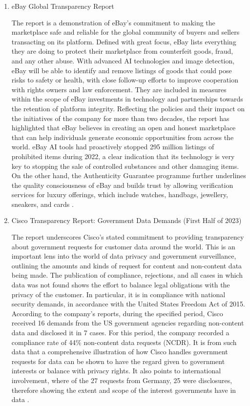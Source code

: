 \begin{enumerate}
\item eBay Global Transparency Report 

 The report is a demonstration of eBay's commitment to making the marketplace safe and reliable for the global community of buyers and sellers transacting on its platform. Defined with great focus, eBay lists everything they are doing to protect their marketplace from counterfeit goods, fraud, and any other abuse. With advanced AI technologies and image detection, eBay will be able to identify and remove listings of goods that could pose risks to safety or health, with close follow-up efforts to improve cooperation with rights owners and law enforcement. They are included in measures within the scope of eBay investments in technology and partnerships towards the retention of platform integrity. Reflecting the policies and their impact on the initiatives of the company for more than two decades, the report has highlighted that eBay believes in creating an open and honest marketplace that can help individuals generate economic opportunities from across the world. eBay AI tools had proactively stopped 295 million listings of prohibited items during 2022, a clear indication that its technology is very key to stopping the sale of controlled substances and other damaging items. On the other hand, the Authenticity Guarantee programme further underlines the quality consciousness of eBay and builds trust by allowing verification services for luxury offerings, which include watches, handbags, jewellery, sneakers, and cards \cite{eBayGlobalTransparencyReport2022}.

 \item Cisco Transparency Report: Government Data Demands (First Half of 2023)

 The report underscores Cisco's stated commitment to providing transparency about government requests for customer data around the world. This is an important lens into the world of data privacy and government surveillance, outlining the amounts and kinds of request for content and non-content data being made. The publication of compliance, rejections, and all cases in which data was not found shows the effort to balance legal obligations with the privacy of the customer. In particular, it is in compliance with national security demands, in accordance with the United States Freedom Act of 2015. According to the company's reports, during the specified period, Cisco received 16 demands from the US government agencies regarding non-content data and disclosed it in 7 cases. For this period, the company recorded a compliance rate of 44\% non-content data requests (NCDR). It is from such data that a comprehensive illustration of how Cisco handles government requests for data can be shown to have the regard given to government interests or balance with privacy rights. It also points to international involvement, where of the 27 requests from Germany, 25 were disclosures, therefore showing the extent and scope of the interest governments have in data \cite{CiscoTransparencyReport}.


\end{enumerate}
